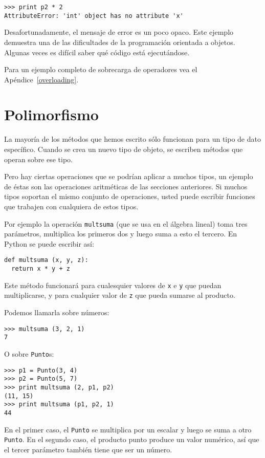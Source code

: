 \beforeverb
\begin{verbatim}
>>> print p2 * 2
AttributeError: 'int' object has no attribute 'x'
\end{verbatim}
\afterverb
%
Desafortunadamente, el mensaje de error es un poco opaco. Este ejemplo
demuestra una de las dificultades de la programación orientada a 
objetos. Algunas veces es difícil saber qué código está ejecutándose.

Para un ejemplo completo de sobrecarga de operadores vea el Apéndice~\ref{overloading}.


\section{Polimorfismo}

La mayoría de los métodos que hemos escrito sólo funcionan
para un tipo de dato específico. Cuando se crea un nuevo
tipo de objeto, se escriben métodos que operan sobre ese tipo.

Pero hay ciertas operaciones que se podrían aplicar a muchos
tipos, un ejemplo de éstas son las operaciones aritméticas de 
las secciones anteriores. Si muchos tipos soportan el mismo
conjunto de operaciones, usted puede escribir funciones que
trabajen con cualquiera de estos tipos.

Por ejemplo la operación  \texttt{multsuma} (que se usa en 
el álgebra lineal) toma tres parámetros, multiplica los
primeros dos y luego suma a esto el tercero. En Python 
se puede escribir así:

\beforeverb
\begin{verbatim}
def multsuma (x, y, z):
  return x * y + z
\end{verbatim}
\afterverb
%
Este método funcionará para cualesquier valores de \texttt{x} e \texttt{y}
que puedan multiplicarse, y para cualquier valor de \texttt{z} que pueda
sumarse al producto.

Podemos llamarla sobre números:

\beforeverb
\begin{verbatim}
>>> multsuma (3, 2, 1)
7
\end{verbatim}
\afterverb
%
O sobre  \texttt{Punto}s:

\beforeverb
\begin{verbatim}
>>> p1 = Punto(3, 4)
>>> p2 = Punto(5, 7)
>>> print multsuma (2, p1, p2)
(11, 15)
>>> print multsuma (p1, p2, 1)
44
\end{verbatim}
\afterverb
%
En el primer caso, el  \texttt{Punto} se multiplica por un escalar
y luego se suma a otro  \texttt{Punto}. En el segundo caso, el 
producto punto produce un valor numérico, así que el tercer
parámetro también tiene que ser un número.

